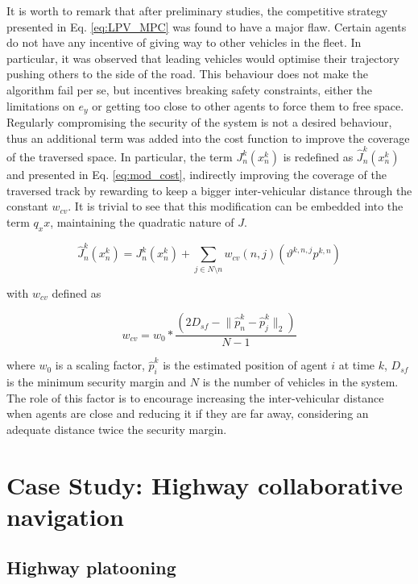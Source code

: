 \documentclass[a4paper,fleqn]{cas-sc}
\begin{document}
It is worth to remark that after preliminary studies, the competitive strategy presented in Eq. \eqref{eq:LPV_MPC} was found to have a major flaw. Certain agents do not have any incentive of giving way to other vehicles in the fleet. In particular, it was observed that leading vehicles would optimise their trajectory pushing others to the side of the road. This behaviour does not make the algorithm fail per se, but incentives breaking safety constraints, either the limitations on $e_y$ or getting too close to other agents to force them to free space. Regularly compromising the security of the system is not a desired behaviour, thus an additional term was added into the cost function to improve the coverage of the traversed space. In particular,  the term $J^k_n(x^k_n)$ is redefined as $\hat{J}^k_n(x^k_n)$ and presented in Eq. \ref{eq:mod_cost}, indirectly improving the coverage of the traversed track by rewarding to keep a bigger inter-vehicular distance through the constant $w_{cv}$. It is trivial to see that this modification can be embedded into the term $q_xx$, maintaining the quadratic nature of $J$. 

\begin{equation}
    \label{eq:mod_cost}
    \hat{J}^k_n(x^k_n) = J^k_n(x^k_n) + \sum_{j \in N\setminus n }w_{cv}(n,j)(\vartheta^{k,n,j} p^{k,n})
\end{equation}

\noindent with $w_{cv}$ defined as 

\begin{equation}
    \label{eq:mod_cost}
    w_{cv} = w_0 * \frac{(2 D_{sf} - \lVert \hat{p}^k_n - \hat{p}^k_j \rVert_2)}{N-1}
\end{equation}

\noindent where $w_0$ is a scaling factor, $\hat{p}^k_i$ is the estimated position of agent $i$ at time $k$, $D_{sf}$ is the minimum security margin and $N$ is the number of vehicles in the system. The role of this factor is to encourage increasing the inter-vehicular distance when agents are close and reducing it if they are far away, considering an adequate distance twice the security margin. 


\section{Case Study: Highway collaborative navigation}
\label{seq:CaseStudy}
\subsection{Highway platooning}
\end{document}
